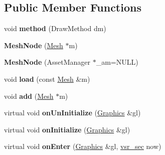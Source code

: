 \subsection*{Public Member Functions}
\begin{DoxyCompactItemize}
\item 
\hypertarget{classvsr_1_1_mesh_node_a5641f5faf4c091ccb0b310df0cc2add0}{void {\bfseries method} (Draw\-Method dm)}\label{classvsr_1_1_mesh_node_a5641f5faf4c091ccb0b310df0cc2add0}

\item 
\hypertarget{classvsr_1_1_mesh_node_a4a4a6ac27a0498ff61d7874a6ebab74e}{{\bfseries Mesh\-Node} (\hyperlink{structvsr_1_1_mesh}{Mesh} $\ast$m)}\label{classvsr_1_1_mesh_node_a4a4a6ac27a0498ff61d7874a6ebab74e}

\item 
\hypertarget{classvsr_1_1_mesh_node_a416d5ec67c9eaf32e54d11f7238a4295}{{\bfseries Mesh\-Node} (Asset\-Manager $\ast$\-\_\-am=N\-U\-L\-L)}\label{classvsr_1_1_mesh_node_a416d5ec67c9eaf32e54d11f7238a4295}

\item 
\hypertarget{classvsr_1_1_mesh_node_a8b34ed56cf4f7ca0b62753f358bd4dc9}{void {\bfseries load} (const \hyperlink{structvsr_1_1_mesh}{Mesh} \&m)}\label{classvsr_1_1_mesh_node_a8b34ed56cf4f7ca0b62753f358bd4dc9}

\item 
\hypertarget{classvsr_1_1_mesh_node_abaeced737cfd21d331d14a2fe1f56bcc}{void {\bfseries add} (\hyperlink{structvsr_1_1_mesh}{Mesh} $\ast$m)}\label{classvsr_1_1_mesh_node_abaeced737cfd21d331d14a2fe1f56bcc}

\item 
\hypertarget{classvsr_1_1_mesh_node_acf0314390591082c127d049e13072e8e}{virtual void {\bfseries on\-Un\-Initialize} (\hyperlink{classvsr_1_1_graphics}{Graphics} \&gl)}\label{classvsr_1_1_mesh_node_acf0314390591082c127d049e13072e8e}

\item 
\hypertarget{classvsr_1_1_mesh_node_afdc50c107fae76857cd6106e631a32d4}{virtual void {\bfseries on\-Initialize} (\hyperlink{classvsr_1_1_graphics}{Graphics} \&gl)}\label{classvsr_1_1_mesh_node_afdc50c107fae76857cd6106e631a32d4}

\item 
\hypertarget{classvsr_1_1_mesh_node_a9aa73652b5efa43a418b5a47697312b5}{virtual void {\bfseries on\-Enter} (\hyperlink{classvsr_1_1_graphics}{Graphics} \&gl, \hyperlink{classvsr_1_1vsr__sec}{vsr\-\_\-sec} now)}\label{classvsr_1_1_mesh_node_a9aa73652b5efa43a418b5a47697312b5}


\end{DoxyCompactItemize}
